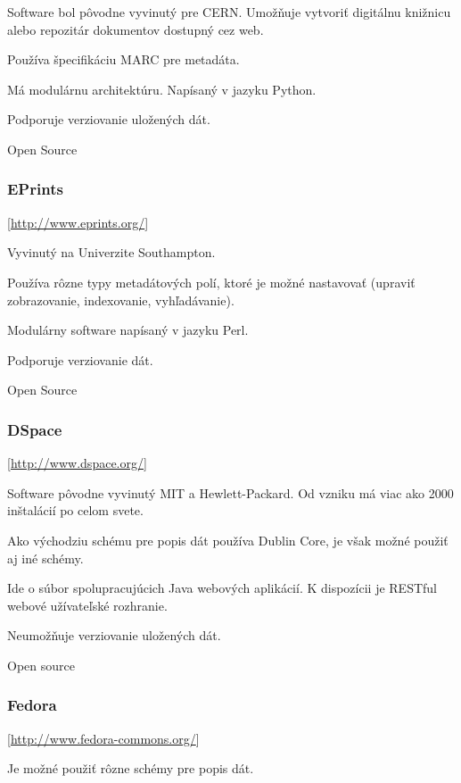 \documentclass[thesis=M,slovak]{FITthesis}[2013/05/06]
\begin{document}
Software bol pôvodne vyvinutý pre CERN. Umožňuje vytvoriť digitálnu knižnicu alebo repozitár dokumentov dostupný cez web. 

Používa špecifikáciu MARC pre metadáta.

Má modulárnu architektúru. Napísaný v jazyku Python.

Podporuje verziovanie uložených dát.

Open Source

%

\subsubsection {EPrints} [\url{http://www.eprints.org/}]

Vyvinutý na Univerzite Southampton.

Používa rôzne typy metadátových polí, ktoré je možné nastavovať (upraviť zobrazovanie, indexovanie, vyhľadávanie).

Modulárny software napísaný v jazyku Perl.

Podporuje verziovanie dát.

Open Source

\subsubsection {DSpace} [\url{http://www.dspace.org/}]

Software pôvodne vyvinutý MIT a Hewlett-Packard. Od vzniku má viac ako 2000 inštalácií po celom svete. 

Ako východziu schému pre popis dát používa Dublin Core, je však možné použiť aj iné schémy.

Ide o súbor spolupracujúcich Java webových aplikácií. K dispozícii je RESTful webové užívateľské rozhranie.

Neumožňuje verziovanie uložených dát.

Open source

\subsubsection {Fedora} [\url{http://www.fedora-commons.org/}]

Je možné použiť rôzne schémy pre popis dát.
\end{document}
